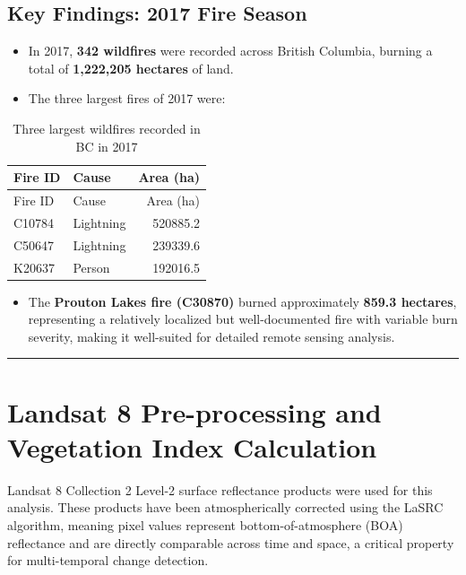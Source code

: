 \documentclass[
]{article}
\providecommand{\tightlist}{%
  \setlength{\itemsep}{0pt}\setlength{\parskip}{0pt}}
\begin{document}
\subsection{Key Findings: 2017 Fire
Season}\label{key-findings-2017-fire-season}

\begin{itemize}
\tightlist
\item
  In 2017, \textbf{342 wildfires} were recorded across British Columbia,
  burning a total of \textbf{1,222,205 hectares} of land.
\item
  The three largest fires of 2017 were:
\end{itemize}

\begin{longtable}[]{@{}llr@{}}
\caption{Three largest wildfires recorded in BC in 2017}\tabularnewline
\toprule\noalign{}
Fire ID & Cause & Area (ha) \\
\midrule\noalign{}
\endfirsthead
\toprule\noalign{}
Fire ID & Cause & Area (ha) \\
\midrule\noalign{}
\endhead
\bottomrule\noalign{}
\endlastfoot
C10784 & Lightning & 520885.2 \\
C50647 & Lightning & 239339.6 \\
K20637 & Person & 192016.5 \\
\end{longtable}

\begin{itemize}
\tightlist
\item
  The \textbf{Prouton Lakes fire (C30870)} burned approximately
  \textbf{859.3 hectares}, representing a relatively localized but
  well-documented fire with variable burn severity, making it
  well-suited for detailed remote sensing analysis.
\end{itemize}

\begin{center}\rule{0.5\linewidth}{0.5pt}\end{center}

\section{Landsat 8 Pre-processing and Vegetation Index
Calculation}\label{landsat-8-pre-processing-and-vegetation-index-calculation}

Landsat 8 Collection 2 Level-2 surface reflectance products were used
for this analysis. These products have been atmospherically corrected
using the LaSRC algorithm, meaning pixel values represent
bottom-of-atmosphere (BOA) reflectance and are directly comparable
across time and space, a critical property for multi-temporal change
detection.
\end{document}
